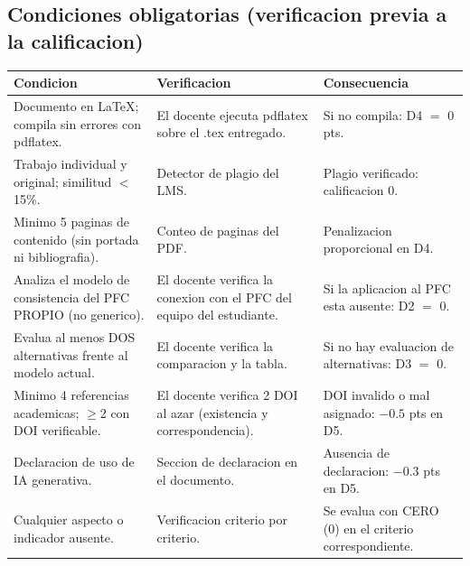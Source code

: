 \documentclass[11pt,a4paper]{article}
\begin{document}
\subsection{Condiciones obligatorias (verificacion previa a la calificacion)}
\renewcommand{\arraystretch}{1.25}
\noindent
\begin{tabularx}{\linewidth}{@{}>{\RaggedRight}X >{\RaggedRight}p{4.6cm} >{\RaggedRight}p{4.4cm}@{}}
    \toprule
    \rowcolor{uteqSoft}\textbf{Condicion} & \textbf{Verificacion} & \textbf{Consecuencia} \\
    \midrule
    Documento en LaTeX; compila sin errores con pdflatex. & El docente ejecuta pdflatex sobre el .tex entregado. & Si no compila: D4 $=$ 0 pts. \\
    Trabajo individual y original; similitud $<$ 15\%. & Detector de plagio del LMS. & Plagio verificado: calificacion 0. \\
    Minimo 5 paginas de contenido (sin portada ni bibliografia). & Conteo de paginas del PDF. & Penalizacion proporcional en D4. \\
    Analiza el modelo de consistencia del PFC PROPIO (no generico). & El docente verifica la conexion con el PFC del equipo del estudiante. & Si la aplicacion al PFC esta ausente: D2 $=$ 0. \\
    Evalua al menos DOS alternativas frente al modelo actual. & El docente verifica la comparacion y la tabla. & Si no hay evaluacion de alternativas: D3 $=$ 0. \\
    Minimo 4 referencias academicas; $\geq$2 con DOI verificable. & El docente verifica 2 DOI al azar (existencia y correspondencia). & DOI invalido o mal asignado: $-0.5$ pts en D5. \\
    Declaracion de uso de IA generativa. & Seccion de declaracion en el documento. & Ausencia de declaracion: $-0.3$ pts en D5. \\
    Cualquier aspecto o indicador ausente. & Verificacion criterio por criterio. & Se evalua con CERO (0) en el criterio correspondiente. \\
    \bottomrule
\end{tabularx}
\renewcommand{\arraystretch}{1.0}
\end{document}
